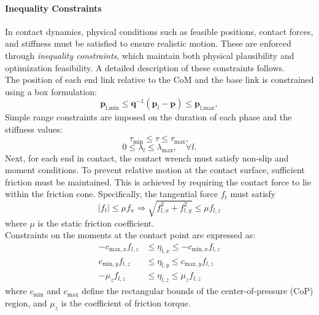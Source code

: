 \documentclass[main.tex]{subfiles}
\begin{document}
\begin{sloppypar}
\paragraph{Inequality Constraints}
In contact dynamics, physical conditions such as feasible positions, contact forces, and stiffness must be satisfied to ensure realistic motion. These are enforced through \textit{inequality constraints}, which maintain both physical plausibility and optimization feasibility. A detailed description of these constraints follows.\\
The position of each end link relative to the CoM and the base link is constrained using a box formulation:
\begin{equation}
\mathbf{p}_{\text{l,min}} \leq \mathbf{q}^{-1}(\mathbf{p}_l - \mathbf{p}) \leq \mathbf{p}_{\text{l,max}},
\end{equation}
Simple range constraints are imposed on the duration of each phase and the stiffness values:
\begin{equation}
    \tau_{\text{min}} \leq \tau \leq \tau_{\text{max}}, \tag{16}
\end{equation}
\begin{equation}
    0 \leq \lambda_l \leq \lambda_{\text{max}}, \quad \forall l. \tag{17}
\end{equation}
Next, for each end in contact, the contact wrench must satisfy non-slip and moment conditions.  
To prevent relative motion at the contact surface, sufficient friction must be maintained. This is achieved by requiring the contact force to lie within the friction cone. Specifically, the tangential force $f_t$ must satisfy 
\begin{equation}
    \lvert f_t \rvert \leq \mu f_n  \Longrightarrow \sqrt{f_{l,x}^2 + f_{l,y}^2} \leq \mu f_{l,z}
\end{equation}
where $\mu$ is the static friction coefficient. \\
Constraints on the moments at the contact point are expressed as:
\begin{align}
-c_{\text{max},x} f_{l,z} &\leq \eta_{l,x} \leq -c_{\text{min},x} f_{l,z} \\
c_{\text{min},y} f_{l,z} &\leq \eta_{l,y} \leq c_{\text{max},y} f_{l,z} \\
-\mu_z f_{l,z} &\leq \eta_{l,z} \leq \mu_z f_{l,z}
\end{align}
where $c_{\text{min}}$ and $c_{\text{max}}$ define the rectangular bounds of the center-of-pressure (CoP) region, and $\mu_z$ is the coefficient of friction torque.\\

\end{sloppypar}
\end{document}
